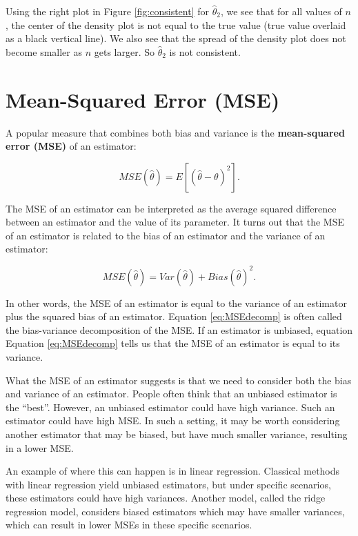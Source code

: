 \documentclass[
]{book}
\theoremstyle{definition}
\theoremstyle{definition}
\theoremstyle{definition}
\theoremstyle{definition}
\theoremstyle{remark}
\begin{document}
Using the right plot in Figure \ref{fig:consistent} for \(\hat{\theta}_2\), we see that for all values of \(n\), the center of the density plot is not equal to the true value (true value overlaid as a black vertical line). We also see that the spread of the density plot does not become smaller as \(n\) gets larger. So \(\hat{\theta}_2\) is not consistent.

\hypertarget{mean-squared-error-mse}{%
\section{Mean-Squared Error (MSE)}\label{mean-squared-error-mse}}

A popular measure that combines both bias and variance is the \textbf{mean-squared error (MSE)} of an estimator:

\begin{equation} 
MSE(\hat{\theta}) = E\left[(\hat{\theta} - \theta)^2 \right].
\label{eq:MSE}
\end{equation}

The MSE of an estimator can be interpreted as the average squared difference between an estimator and the value of its parameter. It turns out that the MSE of an estimator is related to the bias of an estimator and the variance of an estimator:

\begin{equation} 
MSE(\hat{\theta}) = Var(\hat{\theta}) + Bias(\hat{\theta})^2.
\label{eq:MSEdecomp}
\end{equation}

In other words, the MSE of an estimator is equal to the variance of an estimator plus the squared bias of an estimator. Equation \eqref{eq:MSEdecomp} is often called the bias-variance decomposition of the MSE. If an estimator is unbiased, equation Equation \eqref{eq:MSEdecomp} tells us that the MSE of an estimator is equal to its variance.

What the MSE of an estimator suggests is that we need to consider both the bias and variance of an estimator. People often think that an unbiased estimator is the ``best''. However, an unbiased estimator could have high variance. Such an estimator could have high MSE. In such a setting, it may be worth considering another estimator that may be biased, but have much smaller variance, resulting in a lower MSE.

An example of where this can happen is in linear regression. Classical methods with linear regression yield unbiased estimators, but under specific scenarios, these estimators could have high variances. Another model, called the ridge regression model, considers biased estimators which may have smaller variances, which can result in lower MSEs in these specific scenarios.

  
\end{document}

